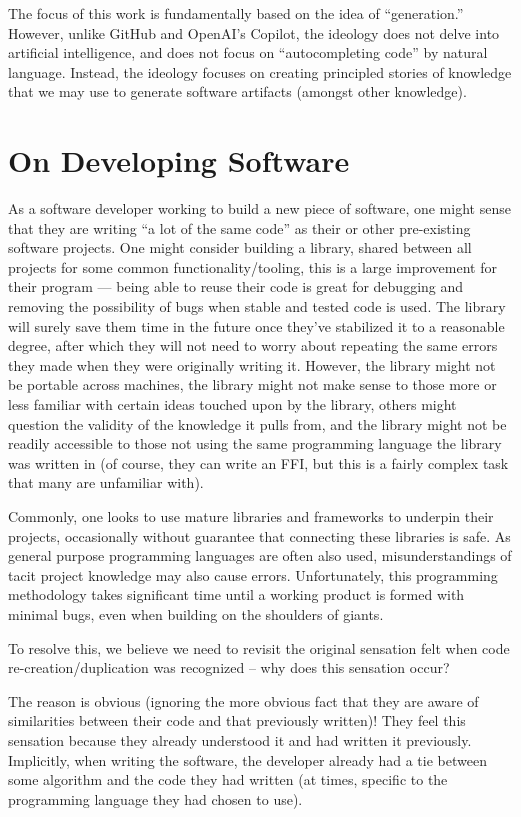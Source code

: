 The focus of this work is fundamentally based on the idea of ``generation.''
However, unlike GitHub and OpenAI's Copilot, the ideology does not delve into
artificial intelligence, and does not focus on ``autocompleting code'' by
natural language. Instead, the ideology focuses on creating principled stories
of knowledge that we may use to generate software artifacts (amongst other
knowledge).

\section{On Developing Software}

As a software developer working to build a new piece of software, one might
sense that they are writing ``a lot of the same code'' as their or other
pre-existing software projects. One might consider building a library, shared
between all projects for some common functionality/tooling, this is a large
improvement for their program --- being able to reuse their code is great for
debugging and removing the possibility of bugs when stable and tested code is
used. The library will surely save them time in the future once they've
stabilized it to a reasonable degree, after which they will not need to worry
about repeating the same errors they made when they were originally writing it.
However, the library might not be portable across machines, the library might
not make sense to those more or less familiar with certain ideas touched upon by
the library, others might question the validity of the knowledge it pulls from,
and the library might not be readily accessible to those not using the same
programming language the library was written in (of course, they can write an
FFI, but this is a fairly complex task
that many are unfamiliar with).

Commonly, one looks to use mature libraries and frameworks to underpin their
projects, occasionally without guarantee that connecting these libraries is
safe. As general purpose programming languages are often also used,
misunderstandings of tacit project knowledge may also cause errors.
Unfortunately, this programming methodology takes significant time until a
working product is formed with minimal bugs, even when building on the shoulders
of giants.

To resolve this, we believe we need to revisit the original sensation felt when
code re-creation/duplication was recognized -- why does this sensation occur?

The reason is obvious (ignoring the more obvious fact that they are aware of
similarities between their code and that previously written)! They feel this
sensation because they already understood it and had written it previously.
Implicitly, when writing the software, the developer already had a tie between
some algorithm and the code they had written (at times, specific to the
programming language they had chosen to use).

